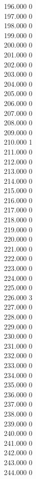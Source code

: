 { 196.000	0 \\
 197.000	0 \\
 198.000	0 \\
 199.000	0 \\
 200.000	0 \\
 201.000	0 \\
 202.000	0 \\
 203.000	0 \\
 204.000	0 \\
 205.000	0 \\
 206.000	0 \\
 207.000	0 \\
 208.000	0 \\
 209.000	0 \\
 210.000	1 \\
 211.000	0 \\
 212.000	0 \\
 213.000	0 \\
 214.000	0 \\
 215.000	0 \\
 216.000	0 \\
 217.000	0 \\
 218.000	0 \\
 219.000	0 \\
 220.000	0 \\
 221.000	0 \\
 222.000	0 \\
 223.000	0 \\
 224.000	0 \\
 225.000	0 \\
 226.000	3 \\
 227.000	0 \\
 228.000	0 \\
 229.000	0 \\
 230.000	0 \\
 231.000	0 \\
 232.000	0 \\
 233.000	0 \\
 234.000	0 \\
 235.000	0 \\
 236.000	0 \\
 237.000	0 \\
 238.000	0 \\
 239.000	0 \\
 240.000	0 \\
 241.000	0 \\
 242.000	0 \\
 243.000	0 \\
 244.000	0 \\
}
